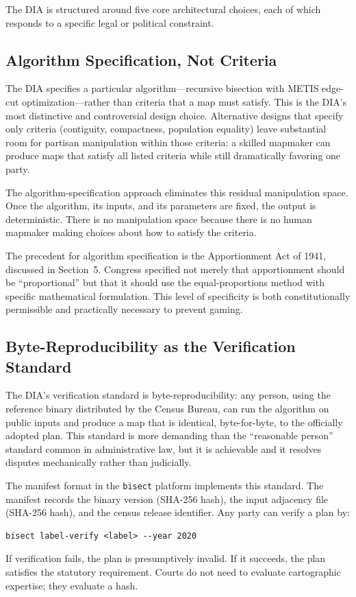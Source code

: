 The DIA is structured around five core architectural choices, each of which responds to a specific legal or political constraint.

\subsection{Algorithm Specification, Not Criteria}

The DIA specifies a particular algorithm---recursive bisection with METIS edge-cut optimization---rather than criteria that a map must satisfy. This is the DIA's most distinctive and controversial design choice. Alternative designs that specify only criteria (contiguity, compactness, population equality) leave substantial room for partisan manipulation within those criteria: a skilled mapmaker can produce maps that satisfy all listed criteria while still dramatically favoring one party.

The algorithm-specification approach eliminates this residual manipulation space. Once the algorithm, its inputs, and its parameters are fixed, the output is deterministic. There is no manipulation space because there is no human mapmaker making choices about how to satisfy the criteria.

The precedent for algorithm specification is the Apportionment Act of 1941, discussed in Section~5. Congress specified not merely that apportionment should be ``proportional'' but that it should use the equal-proportions method with specific mathematical formulation. This level of specificity is both constitutionally permissible and practically necessary to prevent gaming.

\subsection{Byte-Reproducibility as the Verification Standard}

The DIA's verification standard is byte-reproducibility: any person, using the reference binary distributed by the Census Bureau, can run the algorithm on public inputs and produce a map that is identical, byte-for-byte, to the officially adopted plan. This standard is more demanding than the ``reasonable person'' standard common in administrative law, but it is achievable and it resolves disputes mechanically rather than judicially.

The manifest format in the \texttt{bisect} platform implements this standard. The manifest records the binary version (SHA-256 hash), the input adjacency file (SHA-256 hash), and the census release identifier. Any party can verify a plan by:
\begin{verbatim}
bisect label-verify <label> --year 2020
\end{verbatim}
If verification fails, the plan is presumptively invalid. If it succeeds, the plan satisfies the statutory requirement. Courts do not need to evaluate cartographic expertise; they evaluate a hash.

